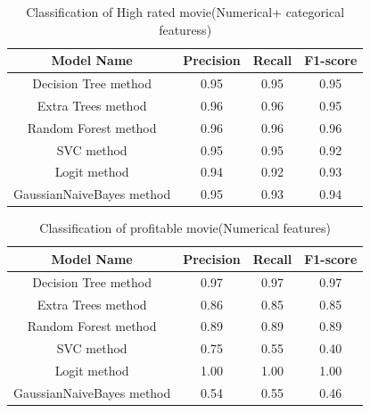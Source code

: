 \documentclass{article}%
\begin{document}
\begin{table}[tb]
\caption{Classification of High rated movie(Numerical+ categorical featuress)}
\label{tab:Classification_of_High_rated_movie_NC}
\begin{center}
\footnotesize
\begin{tabular}{|c|c|c|c|} \hline
\textbf{Model Name}& \textbf{Precision}& \textbf{Recall} & \textbf{F1-score }   \\ \hline \hline
Decision Tree method & 0.95	 & 0.95	& 0.95\\ \hline
Extra Trees method & 0.96 &	0.96 &	0.95\\ \hline
Random Forest method & 0.96	& 0.96 &	0.96\\ \hline
SVC method & 0.95 &	0.95	&0.92\\ \hline
Logit method& 0.94	& 0.92 &	0.93\\ \hline
GaussianNaiveBayes method & 0.95 &	0.93 &	0.94\\ \hline

\end{tabular}
\end{center}
\end{table}


\begin{table}[tb]
\caption{Classification of profitable movie(Numerical features)}
\label{tab:Classification_of_profit_movie}
\begin{center}
\footnotesize
\begin{tabular}{|c|c|c|c|} \hline
\textbf{Model Name}& \textbf{Precision}& \textbf{Recall} & \textbf{F1-score }   \\ \hline \hline
Decision Tree method & 0.97 &	0.97 &	0.97 \\ \hline
Extra Trees method & 0.86	& 0.85 &	0.85\\ \hline
Random Forest method & 0.89 &	0.89	&0.89\\ \hline
SVC method & 0.75 &	0.55	& 0.40\\ \hline
Logit method &  1.00	 &1.00	& 1.00\\ \hline
GaussianNaiveBayes method & 0.54	& 0.55	& 0.46\\ \hline
\end{tabular}
\end{center}
\end{table}
\end{document}
